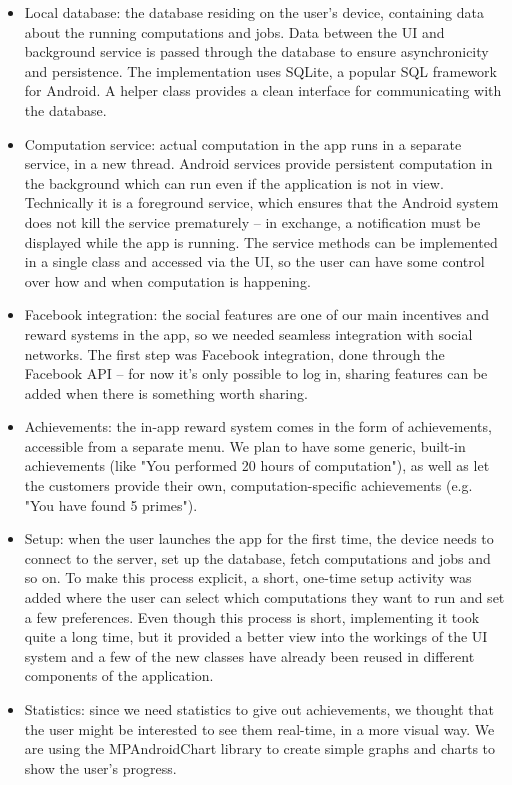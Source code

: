 \documentclass[a4paper,10pt]{article}
\begin{document}
\begin{itemize}
    \item Local database: the database residing on the user's device, containing data about the running computations and jobs. Data between the UI and background service is passed through the database to ensure asynchronicity and persistence. The implementation uses SQLite, a popular SQL framework for Android. A helper class provides a clean interface for communicating with the database.
    \item Computation service: actual computation in the app runs in a separate service, in a new thread. Android services provide persistent computation in the background which can run even if the application is not in view. Technically it is a foreground service, which ensures that the Android system does not kill the service prematurely -- in exchange, a notification must be displayed while the app is running. The service methods can be implemented in a single class and accessed via the UI, so the user can have some control over how and when computation is happening.
    \item Facebook integration: the social features are one of our main incentives and reward systems in the app, so we needed seamless integration with social networks. The first step was Facebook integration, done through the Facebook API -- for now it's only possible to log in, sharing features can be added when there is something worth sharing.
    \item Achievements: the in-app reward system comes in the form of achievements, accessible from a separate menu. We plan to have some generic, built-in achievements (like "You performed 20 hours of computation"), as well as let the customers provide their own, computation-specific achievements (e.g. "You have found 5 primes").
    \item Setup: when the user launches the app for the first time, the device needs to connect to the server, set up the database, fetch computations and jobs and so on. To make this process explicit, a short, one-time setup activity was added where the user can select which computations they want to run and set a few preferences. Even though this process is short, implementing it took quite a long time, but it provided a better view into the workings of the UI system and a few of the new classes have already been reused in different components of the application.
    \item Statistics: since we need statistics to give out achievements, we thought that the user might be interested to see them real-time, in a more visual way. We are using the MPAndroidChart library to create simple graphs and charts to show the user's progress.
\end{itemize}
\end{document}
